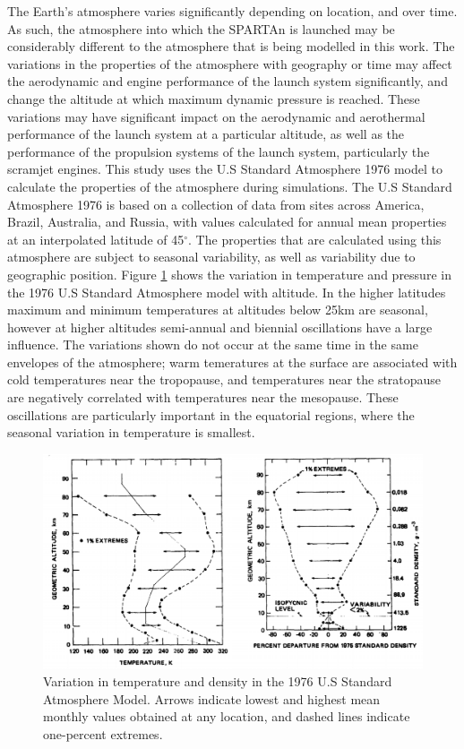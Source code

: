 The Earth's atmosphere varies significantly depending on location, and over time. As such, the atmosphere into which the SPARTAn is launched may be considerably different to the atmosphere that is being modelled in this work. 
The variations in the properties of the atmosphere with geography or time may affect the aerodynamic and engine performance of the launch system significantly, and change the altitude at which maximum dynamic pressure is reached. These variations may have significant impact on the aerodynamic and aerothermal performance of the launch system at a particular altitude, as well as the performance of the propulsion systems of the launch system, particularly the scramjet engines. 
This study uses the U.S Standard Atmosphere 1976 model\cite{Administration1976} to calculate the properties of the atmosphere during simulations. The U.S Standard Atmosphere 1976 is based on a collection of data from sites across America, Brazil, Australia, and Russia, with values calculated for annual mean properties at an interpolated latitude of 45$^\circ$\cite{Administration1976}. The properties that are calculated using this atmosphere are subject to seasonal variability, as well as variability due to geographic position. Figure \ref{fig:AtmosphericVariation} shows the variation in temperature and pressure in the 1976 U.S Standard Atmosphere model with altitude. In the higher latitudes maximum and minimum temperatures at altitudes below 25km are seasonal, however at higher altitudes semi-annual and biennial oscillations have a large influence\cite{Administration1976}. The variations shown do not occur at the same time in the same envelopes of the atmosphere; warm temeratures at the surface are associated with cold temperatures near the tropopause, and temperatures near the stratopause are negatively correlated with temperatures near the mesopause\cite{Administration1976}. These oscillations are particularly important in the equatorial regions, where the seasonal variation in temperature is smallest. 

\begin{figure}[ht]
	\centering
	\includegraphics[width=0.8\linewidth]{figures/A1_uncertainty-analysis/AtmosphericVariation}
	\caption{Variation in temperature and density in the 1976 U.S Standard Atmosphere Model\cite{Administration1976}. Arrows indicate lowest and highest mean monthly values obtained at any location, and dashed lines indicate one-percent extremes.}
	\label{fig:AtmosphericVariation}
\end{figure}

